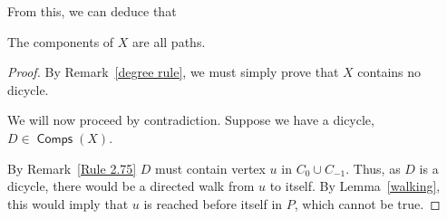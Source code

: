 \documentclass{article}
\DeclareMathOperator{\Comp}{\bm{\mathsf{Comps}}}
\newcommand{\hide}[1]{}
\begin{document}
\vspace{1.75em}
From this, we can deduce that 
\begin{lem} \label{path rule} The components of $X$ are all paths.

\begin{proof} By Remark~\ref{degree rule}, we must simply prove that $X$ contains no dicycle. \hide{Also by 3.1, we note that directed walks along $X$ are unique, meaning, that starting at a vertex, $v$, there is at most one sequence $v_1,v_2\dots v_i$, such that $v_1 = v$ and $(v_j \to v_{j+1}) \in E(X)$ for all $j$.}

\vspace{0.75em}
We will now proceed by contradiction. Suppose we have a dicycle, $D \in \Comp(X)$.

\vspace{0.75em}
By Remark~\ref{Rule 2.75} $D$ must contain vertex $u$ in $C_0 \cup C_{-1}$. Thus, as $D$ is a dicycle, there would be a directed walk from $u$ to itself. By Lemma~\ref{walking}, this would imply that $u$ is reached before itself in $P$, which cannot be true.
\end{proof}
\end{lem}
\end{document}
